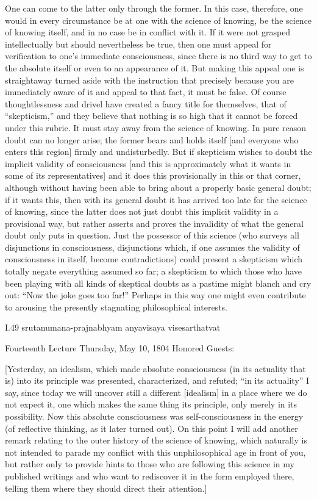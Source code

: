 One can come to the latter only through the former.
In this case, therefore, one would in every circumstance
be at one with the science of knowing,
be the science of knowing itself,
and in no case be in conflict with it.
If it were not grasped intellectually
but should nevertheless be true,
then one must appeal for verification
to one’s immediate consciousness,
since there is no third way to get to the absolute itself
or even to an appearance of it.
But making this appeal one is straightaway turned aside
with the instruction that precisely because you are
immediately aware of it and appeal to that fact,
it must be false.
Of course thoughtlessness and drivel have
created a fancy title for themselves,
that of “skepticism,” and they believe that nothing is
so high that it cannot be forced under this rubric.
It must stay away from the science of knowing.
In pure reason doubt can no longer arise;
the former bears and holds itself
[and everyone who enters this region]
firmly and undisturbedly.
But if skepticism wishes to doubt
the implicit validity of consciousness
[and this is approximately what it
wants in some of its representatives]
and it does this provisionally in this or that corner,
although without having been able to bring about a properly basic
general doubt;
if it wants this, then with its general doubt
it has arrived too late for the science of knowing,
since the latter does not just doubt
this implicit validity in a provisional way,
but rather asserts and proves the invalidity of
what the general doubt only puts in question.
Just the possessor of this science
(who surveys all disjunctions in consciousness,
disjunctions which, if one assumes the validity
of consciousness in itself, become contradictions)
could present a skepticism which totally negate
everything assumed so far;
a skepticism to which those who have been playing
with all kinds of skeptical doubts as a pastime
might blanch and cry out: “Now the joke goes too far!”
Perhaps in this way one might even contribute
to arousing the presently stagnating philosophical interests.

I.49
srutanumana-prajnabhyam anyavisaya visesarthatvat

Fourteenth Lecture
Thursday, May 10, 1804
Honored Guests:

[Yesterday, an idealism, which made absolute consciousness
(in its actuality that is) into its principle was
presented, characterized, and refuted;
“in its actuality” I say,
since today we will uncover still
a different [idealism] in a place
where we do not expect it,
one which makes the same thing its principle,
only merely in its possibility.
Now this absolute consciousness was self-consciousness
in the energy (of reflective thinking, as it later turned out).
On this point I will add another remark
relating to the outer history of the science of knowing,
which naturally is not intended to parade my conflict
with this unphilosophical age in front of you,
but rather only to provide hints to those
who are following this science in my published writings
and who want to rediscover it in the form employed there,
telling them where they should direct their attention.]

